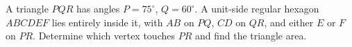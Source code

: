 A triangle $PQR$ has angles $P=75^\circ$, $Q=60^\circ$. A unit-side regular hexagon $ABCDEF$ lies entirely inside it, with $AB$ on $PQ$, $CD$ on $QR$, and either $E$ or $F$ on $PR$. Determine which vertex touches $PR$ and find the triangle area.
